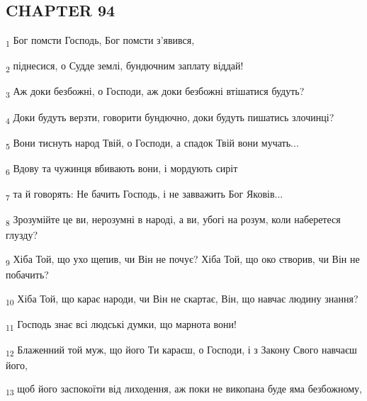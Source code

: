 \subsection{CHAPTER 94}
\begin{tcolorbox}
\textsubscript{1} Бог помсти Господь, Бог помсти з'явився,
\end{tcolorbox}
\begin{tcolorbox}
\textsubscript{2} піднесися, о Судде землі, бундючним заплату віддай!
\end{tcolorbox}
\begin{tcolorbox}
\textsubscript{3} Аж доки безбожні, о Господи, аж доки безбожні втішатися будуть?
\end{tcolorbox}
\begin{tcolorbox}
\textsubscript{4} Доки будуть верзти, говорити бундючно, доки будуть пишатись злочинці?
\end{tcolorbox}
\begin{tcolorbox}
\textsubscript{5} Вони тиснуть народ Твій, о Господи, а спадок Твій вони мучать...
\end{tcolorbox}
\begin{tcolorbox}
\textsubscript{6} Вдову та чужинця вбивають вони, і мордують сиріт
\end{tcolorbox}
\begin{tcolorbox}
\textsubscript{7} та й говорять: Не бачить Господь, і не завважить Бог Яковів...
\end{tcolorbox}
\begin{tcolorbox}
\textsubscript{8} Зрозумійте це ви, нерозумні в народі, а ви, убогі на розум, коли наберетеся глузду?
\end{tcolorbox}
\begin{tcolorbox}
\textsubscript{9} Хіба Той, що ухо щепив, чи Він не почує? Хіба Той, що око створив, чи Він не побачить?
\end{tcolorbox}
\begin{tcolorbox}
\textsubscript{10} Хіба Той, що карає народи, чи Він не скартає, Він, що навчає людину знання?
\end{tcolorbox}
\begin{tcolorbox}
\textsubscript{11} Господь знає всі людські думки, що марнота вони!
\end{tcolorbox}
\begin{tcolorbox}
\textsubscript{12} Блаженний той муж, що його Ти караєш, о Господи, і з Закону Свого навчаєш його,
\end{tcolorbox}
\begin{tcolorbox}
\textsubscript{13} щоб його заспокоїти від лиходення, аж поки не викопана буде яма безбожному,
\end{tcolorbox}

